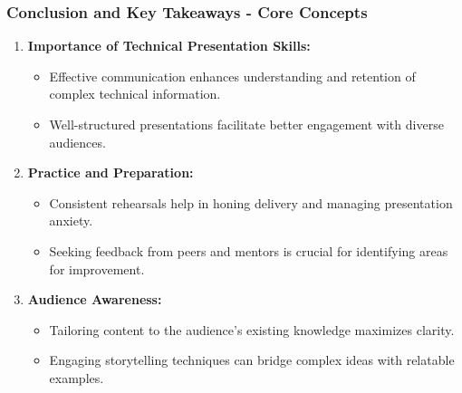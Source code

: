 \documentclass[aspectratio=169]{beamer}
\begin{document}
\begin{frame}[fragile]
    \frametitle{Conclusion and Key Takeaways - Core Concepts}
    \begin{enumerate}
        \item \textbf{Importance of Technical Presentation Skills:}
        \begin{itemize}
            \item Effective communication enhances understanding and retention of complex technical information.
            \item Well-structured presentations facilitate better engagement with diverse audiences.
        \end{itemize}
        
        \item \textbf{Practice and Preparation:}
        \begin{itemize}
            \item Consistent rehearsals help in honing delivery and managing presentation anxiety.
            \item Seeking feedback from peers and mentors is crucial for identifying areas for improvement.
        \end{itemize}
        
        \item \textbf{Audience Awareness:}
        \begin{itemize}
            \item Tailoring content to the audience's existing knowledge maximizes clarity.
            \item Engaging storytelling techniques can bridge complex ideas with relatable examples.
        \end{itemize}
    \end{enumerate}
\end{frame}
\end{document}
